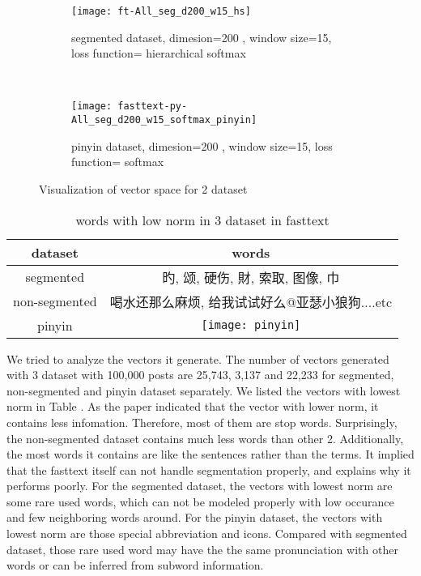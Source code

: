 \begin{figure*}[t!]
    \centering
     
    \begin{subfigure}[t]{0.5\textwidth}
        \centering
        \texttt{[image: ft-All\_seg\_d200\_w15\_hs]}
        \caption{segmented dataset, dimesion=200 , window size=15, loss function=  hierarchical softmax}
    \end{subfigure}%
    ~
    \begin{subfigure}[t]{0.5\textwidth}
        \centering
        \texttt{[image: fasttext-py-All\_seg\_d200\_w15\_softmax\_pinyin]}
        \caption{pinyin dataset,  dimesion=200 , window size=15, loss function= softmax}
    \end{subfigure}
    \caption{Visualization of vector space for 2 dataset}
    \label{tsne}
\end{figure*}

\begin{table}[]
\centering
\caption{words with low norm in 3 dataset in fasttext}
\label{table:low-norm}
\begin{tabular}{|c|c|}
\hline
 dataset  & words  \\
\hline
segmented  &  旳, 颂, 硬伤, 財, 索取, 图像, 巾 \\
non-segmented  & 喝水还那么麻烦, 给我试试好么@亚瑟小狼狗....etc   \\
pinyin     &         \texttt{[image: pinyin]} \\   
\hline
\end{tabular}
\end{table}

We tried to analyze the vectors it generate. The number of vectors generated with 3 dataset with 100,000 posts are 25,743, 3,137 and 22,233 for segmented, non-segmented and pinyin dataset separately. 
We listed the vectors with lowest norm in Table \cite{table:low-norm}. As the paper indicated that the vector with lower norm, it contains less infomation. 
Therefore, most of them are stop words. Surprisingly, the non-segmented dataset contains much less words than other 2. 
Additionally, the most words it contains are like the sentences rather than the terms. It implied that the fasttext itself can not handle segmentation properly, and explains why it performs poorly. 
For the segmented dataset, the vectors with lowest norm are some rare used words, which can not be modeled properly with low occurance and few neighboring words around.
For the pinyin dataset, the vectors with lowest norm are those special abbreviation and icons. Compared with segmented dataset, those rare used word may have the the same pronunciation with other words or can be inferred from subword information.

